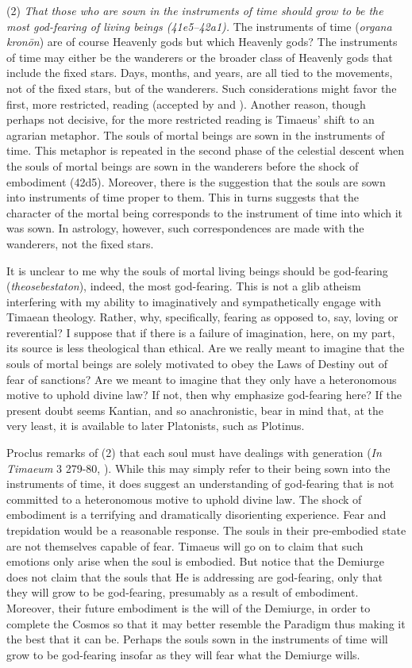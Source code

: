 (2) \emph{That those who are sown in the instruments of time should grow to be the most god-fearing of living beings (41e5--42a1).} The instruments of time (\emph{organa kronōn}) are of course Heavenly gods but which Heavenly gods? The instruments of time may either be the wanderers or the broader class of Heavenly gods that include the fixed stars. Days, months, and years, are all tied to the movements, not of the fixed stars, but of the wanderers. Such considerations might favor the first, more restricted, reading (accepted by \citealt[143 n4]{Archer-Hind:1888qd} and \citealt[258--9]{Taylor:1928qb}). Another reason, though perhaps not decisive, for the more restricted reading is Timaeus' shift to an agrarian metaphor. The souls of mortal beings are sown in the instruments of time. This metaphor is repeated in the second phase of the celestial descent when the souls of mortal beings are sown in the wanderers before the shock of embodiment (42d5). Moreover, there is the suggestion that the souls are sown into instruments of time proper to them. This in turns suggests that the character of the mortal being corresponds to the instrument of time into which it was sown. In astrology, however, such correspondences are made with the wanderers, not the fixed stars.

It is unclear to me why the souls of mortal living beings should be god-fearing (\emph{theosebestaton}), indeed, the most god-fearing. This is not a glib atheism interfering with my ability to imaginatively and sympathetically engage with Timaean theology. Rather, why, specifically, fearing as opposed to, say, loving or reverential? I suppose that if there is a failure of imagination, here, on my part, its source is less theological than ethical. Are we really meant to imagine that the souls of mortal beings are solely motivated to obey the Laws of Destiny out of fear of sanctions? Are we meant to imagine that they only have a heteronomous motive to uphold divine law? If not, then why emphasize god-fearing here? If the present doubt seems Kantian, and so anachronistic, bear in mind that, at the very least, it is available to later Platonists, such as Plotinus.

Proclus remarks of (2) that each soul must have dealings with generation (\emph{In Timaeum} 3 279-80, \citealt{Diehl:1903re}). While this may simply refer to their being sown into the instruments of time, it does suggest an understanding of god-fearing that is not committed to a heteronomous motive to uphold divine law. The shock of embodiment is a terrifying and dramatically disorienting experience. Fear and trepidation would be a reasonable response. The souls in their pre-embodied state are not themselves capable of fear. Timaeus will go on to claim that such emotions only arise when the soul is embodied. But notice that the Demiurge does not claim that the souls that He is addressing are god-fearing, only that they will grow to be god-fearing, presumably as a result of embodiment. Moreover, their future embodiment is the will of the Demiurge, in order to complete the Cosmos so that it may better resemble the Paradigm thus making it the best that it can be. Perhaps the souls sown in the instruments of time will grow to be god-fearing insofar as they will fear what the Demiurge wills.


